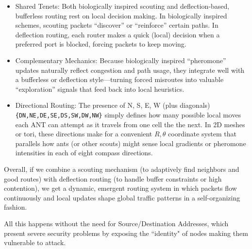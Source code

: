 \documentclass[../HFT-main.tex]{subfiles} %
\begin{document}
\begin{itemize}
\item Shared Tenets: Both biologically inspired scouting and deflection-based, bufferless routing rest on local decision making. In biologically inspired schemes, scouting packets “discover” or “reinforce” certain paths. In deflection routing, each router makes a quick (local) decision when a preferred port is blocked, forcing packets to keep moving.
\item Complementary Mechanics: Because biologically inspired “pheromone” updates naturally reflect congestion and path usage, they integrate well with a bufferless or deflection style—turning forced misroutes into valuable “exploration” signals that feed back into local heuristics.
\item Directional Routing: The presence of N, S, E, W (plus diagonals) \texttt{\{DN,NE,DE,SE,DS,SW,DW,NW\}} simply defines how many possible local moves each ANT can attempt as it travels from one cell the the next.  In 2D meshes or tori, these directions make for a convenient $R,\theta$ coordinate system that parallels how ants (or other scouts) might sense local gradients or pheromone intensities in each of eight compass directions.
\end{itemize}

Overall, if we combine a scouting mechanism (to adaptively find neighbors and good routes) with deflection routing (to handle buffer constraints or high contention), we get a dynamic, emergent routing system in which packets flow continuously and local updates shape global traffic patterns in a self-organizing fashion.

All this happens without the need for Source/Destination Addresses, which present severe security problems by exposing the ``identity" of nodes making them vulnerable to attack.
\end{document}
